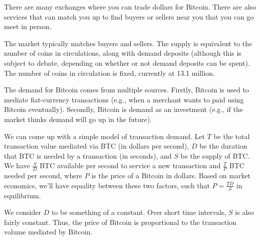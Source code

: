 \documentclass[12pt]{article}
\begin{document}
There are many exchanges where you can trade dollars for Bitcoin. There are also services that can match you up to find buyers or sellers near you that you can go meet in person.

The market typically matches buyers and sellers. The supply is equivalent to the number of coins in circulations, along with demand deposits (although this is subject to debate, depending on whether or not demand deposits can be spent). The number of coins in circulation is fixed, currently at 13.1 million.

The demand for Bitcoin comes from multiple sources. Firstly, Bitcoin is used to mediate fiat-currency transactions (e.g., when a merchant wants to paid using Bitcoin eventually). Secondly, Bitcoin is demand as an investment (e.g., if the market thinks demand will go up in the future).

We can come up with a simple model of transaction demand. Let $T$ be the total transaction value mediated via BTC (in dollars per second), $D$ be the duration that BTC is needed by a transaction (in seconds), and $S$ be the supply of BTC. We have $\frac{S}{D}$ BTC available per second to service a new transaction and $\frac{T}{P}$ BTC needed per second, where $P$ is the price of a Bitcoin in dollars. Based on market economics, we'll have equality between these two factors, such that $P = \frac{TD}{S}$ in equilibrium.

We consider $D$ to be something of a constant. Over short time intervals, $S$ is also fairly constant. Thus, the price of Bitcoin is proportional to the transaction volume mediated by Bitcoin.
\end{document}
